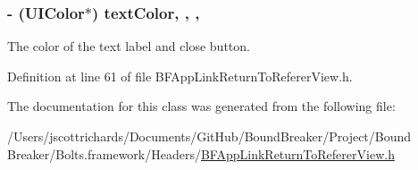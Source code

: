 \subsubsection[{text\+Color}]{\setlength{\rightskip}{0pt plus 5cm}-\/ (U\+I\+Color$\ast$) text\+Color\hspace{0.3cm}{\ttfamily [read]}, {\ttfamily [write]}, {\ttfamily [nonatomic]}, {\ttfamily [strong]}}\label{interface_b_f_app_link_return_to_referer_view_acef579105c567f8f22a2604ea388a37b}
The color of the text label and close button. 

Definition at line 61 of file B\+F\+App\+Link\+Return\+To\+Referer\+View.\+h.



The documentation for this class was generated from the following file\+:\begin{DoxyCompactItemize}
\item 
/\+Users/jscottrichards/\+Documents/\+Git\+Hub/\+Bound\+Breaker/\+Project/\+Bound Breaker/\+Bolts.\+framework/\+Headers/\hyperlink{_b_f_app_link_return_to_referer_view_8h}{B\+F\+App\+Link\+Return\+To\+Referer\+View.\+h}\end{DoxyCompactItemize}
